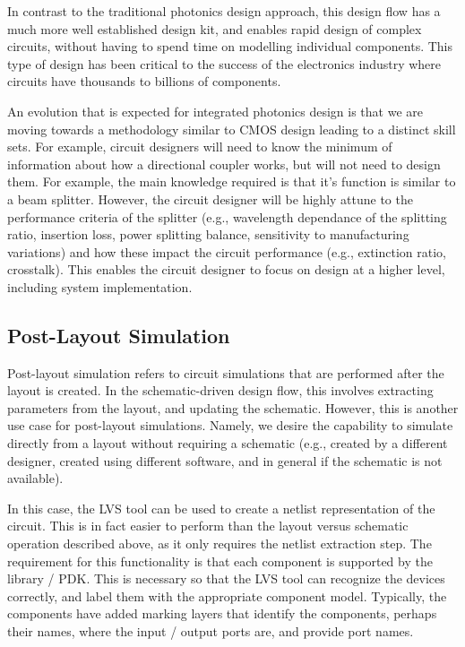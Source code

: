 \documentclass[journal]{spie}
\begin{document}
In contrast to the traditional photonics design approach, this design flow has a much more well established design kit, and enables rapid design of complex circuits, without having to spend time on modelling individual components.  This type of design has been critical to the success of the electronics industry where circuits have thousands to billions of components.

An evolution that is expected for integrated photonics design is that we are moving towards a methodology similar to CMOS design leading to a distinct skill sets.  For example, circuit designers will need to know the minimum of information about how a directional coupler works, but will not need to design them. For example, the main knowledge required is that it's function is similar to a beam splitter.  However, the circuit designer will be highly attune to the performance criteria of the splitter (e.g., wavelength dependance of the splitting ratio, insertion loss, power splitting balance, sensitivity to manufacturing variations) and how these impact the circuit performance (e.g., extinction ratio, crosstalk).  This enables the circuit designer to focus on design at a higher level, including system implementation.


\subsection{Post-Layout Simulation}

Post-layout simulation refers to circuit simulations that are performed after the layout is created.  In the schematic-driven design flow, this involves extracting parameters from the layout, and updating the schematic.  However, this is another use case for post-layout simulations.  Namely, we desire the capability to simulate directly from a layout without requiring a schematic (e.g., created by a different designer,  created using different software, and in general if the schematic is not available).

In this case, the LVS tool can be used to create a netlist representation of the circuit.  This is in fact easier to perform than the layout versus schematic operation described above, as it only requires the netlist extraction step.  The requirement for this functionality is that each component is supported by the library / PDK.  This is necessary so that the LVS tool can recognize the devices correctly, and label them with the appropriate component model.  Typically, the components have added marking layers that identify the components, perhaps their names, where the input / output ports are, and provide port names.
\end{document}
